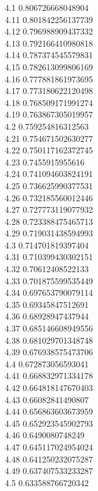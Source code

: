 {4.1	0.806726668048904\\
4.11	0.801842256137739\\
4.12	0.796988909437332\\
4.13	0.792166410980818\\
4.14	0.787374545579831\\
4.15	0.782613099806169\\
4.16	0.777881861973695\\
4.17	0.773180622120498\\
4.18	0.768509171991274\\
4.19	0.763867305019957\\
4.2	0.759254816312563\\
4.21	0.754671502630277\\
4.22	0.750117162372745\\
4.23	0.7455915955616\\
4.24	0.741094603824191\\
4.25	0.736625990377531\\
4.26	0.732185560012446\\
4.27	0.727773119077932\\
4.28	0.723388475465713\\
4.29	0.719031438594993\\
4.3	0.714701819397404\\
4.31	0.710399430302151\\
4.32	0.70612408522133\\
4.33	0.701875599535449\\
4.34	0.697653790079114\\
4.35	0.69345847512691\\
4.36	0.68928947437944\\
4.37	0.685146608949556\\
4.38	0.681029701348748\\
4.39	0.676938575473706\\
4.4	0.672873056593041\\
4.41	0.668832971334178\\
4.42	0.664818147670403\\
4.43	0.66082841490807\\
4.44	0.656863603673959\\
4.45	0.652923545902793\\
4.46	0.6490080748249\\
4.47	0.645117024954024\\
4.48	0.641250232075287\\
4.49	0.637407533233287\\
4.5	0.633588766720342\\
}
